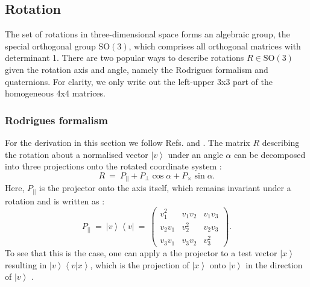 \subsection{Rotation}
The set of rotations in three-dimensional space forms an algebraic group, the special orthogonal group $\mathrm{SO\left(3\right)}$,
which comprises all orthogonal matrices with determinant 1.
There are two popular ways to describe rotations $R \in \mathrm{SO\left(3\right)}$ given the rotation axis and angle, 
namely the Rodrigues formalism and quaternions. 
For clarity, we only write out the left-upper 3x3 part of the homogeneous 4x4 matrices.


\subsubsection{Rodrigues formalism}
For the derivation in this section we follow Refs. \cite[p. 718, p. 816]{Arens2015} and \cite{wiki_rodrigues}.
The matrix $R$ describing the rotation about a normalised vector $\left|v\right>$ under an angle $\alpha$ can be decomposed into
three projections onto the rotated coordinate system \cite[p. 718, p. 816]{Arens2015}:
\begin{equation}
	\boxed{R \ = \ P_{||} + P_{\perp} \cos \alpha + P_{\times} \sin \alpha.}
	\label{eq:rodrigues}
\end{equation}
Here, $P_{||}$ is the projector onto the axis itself, which remains invariant under a rotation and is written as \cite[p. 814]{Arens2015}:
\begin{equation}
	P_{||} \ =\ \left|v\right> \left<v\right| \ =\ 
		\left( \begin{array}{ccc} 
			v_1^2   &    v_1 v_2 &       v_1 v_3 \\
			v_2 v_1 &      v_2^2 &       v_2 v_3 \\
			v_3 v_1 &    v_3 v_2 &         v_3^2
		\end{array} \right).
\end{equation}
To see that this is the case, one can apply a the projector to a test vector $\left| x \right>$ resulting in $\left|v\right> \left<v | x \right>$,
which is the projection of $\left| x \right>$ onto $\left| v \right>$ in the direction of $\left| v \right>$ \cite[p. 814]{Arens2015}.

